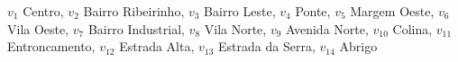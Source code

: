 $v_{1}$ Centro, $v_{2}$ Bairro Ribeirinho, $v_{3}$ Bairro Leste, $v_{4}$ Ponte, $v_{5}$ Margem Oeste, $v_{6}$ Vila Oeste, $v_{7}$ Bairro Industrial, $v_{8}$ Vila Norte, $v_{9}$ Avenida Norte, $v_{10}$ Colina, $v_{11}$ Entroncamento, $v_{12}$ Estrada Alta, $v_{13}$ Estrada da Serra, $v_{14}$ Abrigo
